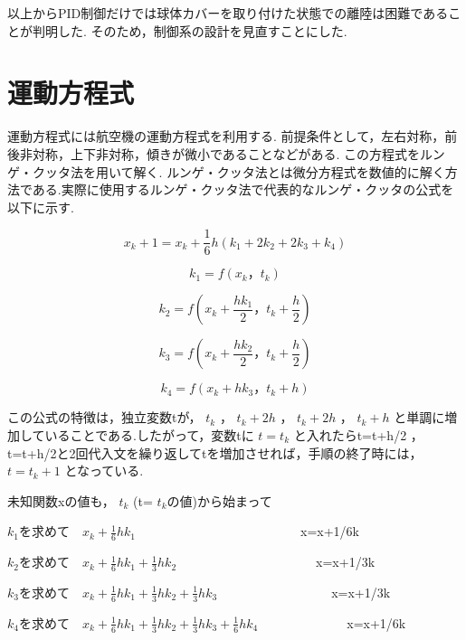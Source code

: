 \documentclass[12pt,oneside]{sotsuken_paper}
\begin{document}
以上からPID制御だけでは球体カバーを取り付けた状態での離陸は困難であることが判明した.
そのため，制御系の設計を見直すことにした.

\section{運動方程式}
運動方程式には航空機の運動方程式を利用する.
前提条件として，左右対称，前後非対称，上下非対称，傾きが微小であることなどがある.
この方程式をルンゲ・クッタ法を用いて解く.
ルンゲ・クッタ法とは微分方程式を数値的に解く方法である.実際に使用するルンゲ・クッタ法で代表的なルンゲ・クッタの公式を以下に示す.

\begin{equation}
	x_k+1 = x_k+\frac{1}{6}h(k_1+2k_2+2k_3+k_4)
	\label{eq1}
\end{equation}

\begin{equation}
	k_1 = f(x_k，t_k)
	\label{eq2}
\end{equation}

\begin{equation}
	k_2 = f(x_k+\frac{hk_1}{2}，t_k+\frac{h}{2})
	\label{eq3}
\end{equation}

\begin{equation}
	k_3 = f(x_k+\frac{hk_2}{2}，t_k+\frac{h}{2})
	\label{eq4}
\end{equation}

\begin{equation}
	k_4 = f(x_k+hk_3，t_k+h)
	\label{eq5}
\end{equation}

この公式の特徴は，独立変数tが， \(t_k\) ， \(t_k+2h\) ， \(t_k+2h\) ， \(t_k+h\) と単調に増加していることである.したがって，変数tに \(t=t_k\) と入れたらt=t+h/2 ， t=t+h/2と2回代入文を繰り返してtを増加させれば，手順の終了時には， \(t=t_k+1\) となっている.


未知関数xの値も， \(t_k\) (t= \(t_k\)の値)から始まって

\(k_1\)を求めて　\(x_k+\frac{1}{6}hk_1\)　　　　　　　　　　　　　x=x+1/6k


\(k_2\)を求めて　\(x_k+\frac{1}{6}hk_1+\frac{1}{3}hk_2\)　　　　　　　　　　　x=x+1/3k


\(k_3\)を求めて　\(x_k+\frac{1}{6}hk_1+\frac{1}{3}hk_2+\frac{1}{3}hk_3\)　　　　　　　　　x=x+1/3k


\(k_4\)を求めて　\(x_k+\frac{1}{6}hk_1+\frac{1}{3}hk_2+\frac{1}{3}hk_3+\frac{1}{6}hk_4\)　　　　　　　x=x+1/6k
\end{document}
